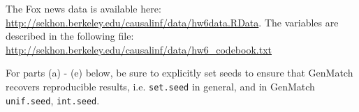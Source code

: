 \documentclass{article}
\begin{document}
\noindent The Fox news data is available here:
\url{http://sekhon.berkeley.edu/causalinf/data/hw6data.RData}.
The variables are described in the following file:
\url{http://sekhon.berkeley.edu/causalinf/data/hw6_codebook.txt}




\vspace{1em}
\noindent For parts (a) - (e) below, be sure to explicitly set seeds
to ensure that GenMatch recovers reproducible results,
i.e. \texttt{set.seed} in general, and in GenMatch \texttt{unif.seed}, \texttt{int.seed}.
\end{document}
